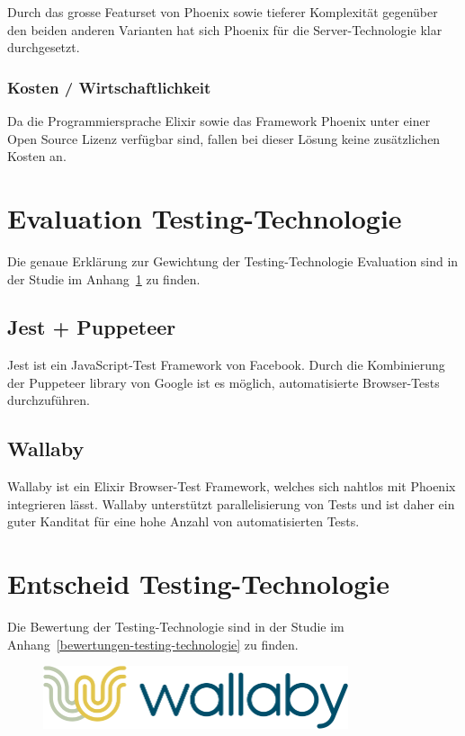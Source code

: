 Durch das grosse Featurset von Phoenix sowie tieferer Komplexität gegenüber den
beiden anderen Varianten hat sich Phoenix für die Server-Technologie klar
durchgesetzt.

\subsubsection{Kosten / Wirtschaftlichkeit}

Da die Programmiersprache Elixir sowie das Framework Phoenix unter einer
Open Source Lizenz verfügbar sind, fallen bei dieser Lösung keine zusätzlichen
Kosten an.

\clearpage
\section{Evaluation Testing-Technologie}\label{evaluation-testing-technologie}

\noindent{}Die genaue Erklärung zur Gewichtung der Testing-Technologie
Evaluation sind in der Studie im Anhang~\ref{evaluation-testing-technologie}
zu finden.

\subsection{Jest + Puppeteer}

Jest ist ein JavaScript-Test Framework von Facebook. Durch die Kombinierung der
Puppeteer \Gls{library} von Google ist es möglich, automatisierte Browser-Tests
durchzuführen.

\subsection{Wallaby}

Wallaby ist ein Elixir Browser-Test Framework, welches sich nahtlos mit Phoenix
integrieren lässt. Wallaby unterstützt parallelisierung von Tests und ist daher
ein guter Kanditat für eine hohe Anzahl von automatisierten Tests.

\section{Entscheid Testing-Technologie}\label{entscheid-testing-technologie}

Die Bewertung der Testing-Technologie sind in der Studie im
Anhang~\ref{bewertungen-testing-technologie} zu finden.

\begin{figure}[!htb]
  \centering
  \includegraphics[width=0.8\textwidth]{figures/wallaby.png}
\end{figure}

